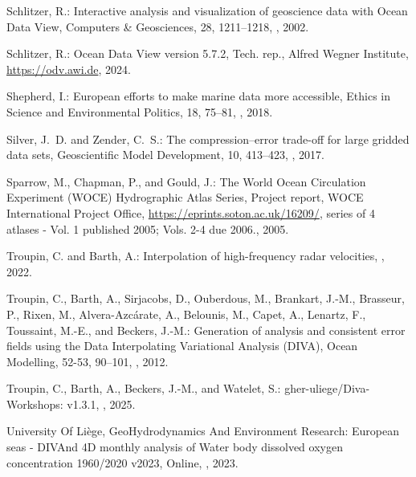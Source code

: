 \documentclass[essd, manuscript]{copernicus}
\begin{document}
\begin{thebibliography}{52}
Schlitzer, R.: Interactive analysis and visualization of geoscience data with
  Ocean Data View, Computers \& Geosciences, 28, 1211–1218,
  , 2002.

Schlitzer, R.: {Ocean Data View version 5.7.2}, Tech. rep., Alfred Wegner
  Institute, \urlprefix\url{https://odv.awi.de}, 2024.

Shepherd, I.: European efforts to make marine data more accessible, Ethics in
  Science and Environmental Politics, 18, 75–81, ,
  2018.

Silver, J.~D. and Zender, C.~S.: The compression–error trade-off for large
  gridded data sets, Geoscientific Model Development, 10, 413–423,
  , 2017.

Sparrow, M., Chapman, P., and Gould, J.: {The World Ocean Circulation
  Experiment (WOCE) Hydrographic Atlas Series}, Project report, {WOCE
  International Project Office},
  \urlprefix\url{https://eprints.soton.ac.uk/16209/}, series of 4 atlases -
  Vol. 1 published 2005; Vols. 2-4 due 2006., 2005.

Troupin, C. and Barth, A.: Interpolation of high-frequency radar velocities,
  , 2022.

Troupin, C., Barth, A., Sirjacobs, D., Ouberdous, M., Brankart, J.-M.,
  Brasseur, P., Rixen, M., Alvera-Azcárate, A., Belounis, M., Capet, A.,
  Lenartz, F., Toussaint, M.-E., and Beckers, J.-M.: Generation of analysis and
  consistent error fields using the Data Interpolating Variational Analysis
  (DIVA), Ocean Modelling, 52-53, 90--101, ,
  2012.

Troupin, C., Barth, A., Beckers, J.-M., and Watelet, S.:
  gher-uliege/Diva-Workshops: v1.3.1, , 2025.

{{University Of Liège, GeoHydrodynamics And Environment Research}}: European
  seas - DIVAnd 4D monthly analysis of Water body dissolved oxygen
  concentration 1960/2020 v2023, Online,
  , 2023.


\end{thebibliography}
\end{document}
